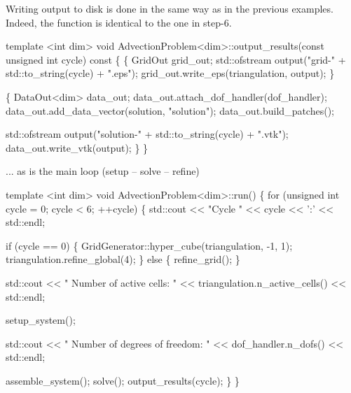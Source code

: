 Writing output to disk is done in the same way as in the previous examples. Indeed, the function is identical to the one in step-\/6.


\begin{DoxyCode}
\textcolor{keyword}{template} <\textcolor{keywordtype}{int} dim>
\textcolor{keywordtype}{void} AdvectionProblem<dim>::output\_results(\textcolor{keyword}{const} \textcolor{keywordtype}{unsigned} \textcolor{keywordtype}{int} cycle)\textcolor{keyword}{ const}
\textcolor{keyword}{}\{
    \{
        GridOut grid\_out;
        std::ofstream output(\textcolor{stringliteral}{"grid-"} + std::to\_string(cycle) + \textcolor{stringliteral}{".eps"});
        grid\_out.write\_eps(triangulation, output);
    \}

    \{
        DataOut<dim> data\_out;
        data\_out.attach\_dof\_handler(dof\_handler);
        data\_out.add\_data\_vector(solution, \textcolor{stringliteral}{"solution"});
        data\_out.build\_patches();

        std::ofstream output(\textcolor{stringliteral}{"solution-"} + std::to\_string(cycle) + \textcolor{stringliteral}{".vtk"});
        data\_out.write\_vtk(output);
    \}
\}
\end{DoxyCode}


... as is the main loop (setup -- solve -- refine)


\begin{DoxyCode}
\textcolor{keyword}{template} <\textcolor{keywordtype}{int} dim>
\textcolor{keywordtype}{void} AdvectionProblem<dim>::run()
\{
    \textcolor{keywordflow}{for} (\textcolor{keywordtype}{unsigned} \textcolor{keywordtype}{int} cycle = 0; cycle < 6; ++cycle) \{
        std::cout << \textcolor{stringliteral}{"Cycle "} << cycle << \textcolor{charliteral}{':'} << std::endl;

        \textcolor{keywordflow}{if} (cycle == 0) \{
            GridGenerator::hyper\_cube(triangulation, -1, 1);
            triangulation.refine\_global(4);
        \} \textcolor{keywordflow}{else} \{
            refine\_grid();
        \}


        std::cout << \textcolor{stringliteral}{"   Number of active cells:       "}
                  << triangulation.n\_active\_cells() << std::endl;

        setup\_system();

        std::cout << \textcolor{stringliteral}{"   Number of degrees of freedom: "} << dof\_handler.n\_dofs()
                  << std::endl;

        assemble\_system();
        solve();
        output\_results(cycle);
    \}
\}
\end{DoxyCode}


